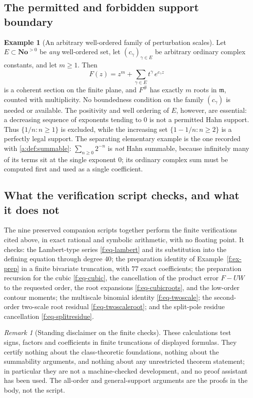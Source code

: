 \documentclass[11pt,a4paper]{article}
\numberwithin{equation}{section}
\theoremstyle{definition}
\newtheorem{example}[theorem]{Example}
\theoremstyle{remark}
\newtheorem{remark}[theorem]{Remark}
\theoremstyle{plain}
\newcommand{\No}{\mathbf{No}}
\newcommand{\mm}{\mathfrak m}
\newcommand{\ev}[1]{#1^{\#}}
\begin{document}
\subsection{The permitted and forbidden support boundary}
\label{f:sub-support}

\begin{example}[An arbitrary well-ordered family of perturbation
scales]\label{f:ex-support}
Let $E\subset\No^{>0}$ be \emph{any} well-ordered set, let
$(c_{\gamma})_{\gamma\in E}$ be arbitrary ordinary complex constants,
and let $m\ge1$.  Then
\[
 F(z)=z^{m}+\sum_{\gamma\in E}t^{\gamma}\,e^{c_{\gamma}z}
\]
is a coherent section on the finite plane, and $\ev F$ has exactly $m$
roots in $\mm$, counted with multiplicity.  No boundedness condition on
the family $(c_{\gamma})$ is needed or available.  The positivity and
well ordering of $E$, however, are essential: a decreasing sequence of
exponents tending to $0$ is not a permitted Hahn support.  Thus
$\{1/n:n\ge1\}$ is excluded, while the increasing set
$\{1-1/n:n\ge2\}$ is a perfectly legal support.  The separating
elementary example is the one recorded with
\ref{a:def:summable}: $\sum_{n\ge0}2^{-n}$ is \emph{not} Hahn summable,
because infinitely many of its terms sit at the single exponent $0$;
its ordinary complex sum must be computed first and used as a single
coefficient.
\end{example}

\subsection{What the verification script checks, and what it does not}
\label{f:sub-verify}

The nine preserved companion scripts together perform the finite
verifications cited above, in exact rational and symbolic arithmetic, with no floating
point.  It checks: the Lambert-type series \eqref{f:eq-lambert} and its
substitution into the defining equation through degree $40$; the
preparation identity of Example~\ref{f:ex-prep} in a finite bivariate
truncation, with $77$ exact coefficients; the preparation recursion for
the cubic \eqref{f:eq-cubic}, the cancellation of the product error
$F-UW$ to the requested order, the root expansions
\eqref{f:eq-cubicroots}, and the low-order contour moments; the
multiscale binomial identity \eqref{f:eq-twoscale}; the second-order
two-scale root residual \eqref{f:eq-twoscaleroot}; and the split-pole
residue cancellation \eqref{f:eq-splitresidue}.

\begin{remark}[Standing disclaimer on the finite
checks]\label{f:rem-verifyscope}
These calculations test signs, factors and coefficients in finite
truncations of displayed formulas.  They certify nothing about the
class-theoretic foundations, nothing about the summability arguments,
and nothing about any unrestricted theorem statement; in particular they
are not a machine-checked development, and no proof assistant has been
used.  The all-order and general-support arguments are the proofs in the
body, not the script.
\end{remark}
\end{document}
